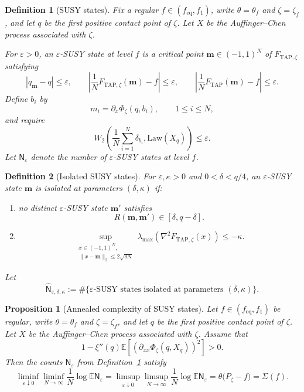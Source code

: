\documentclass[10pt,a4paper]{amsart}
\newtheorem{proposition}{Proposition}
\newtheorem{definition}{Definition}
\newcommand{\Law}{\mathrm{Law}}
\newcommand{\TAP}{\mathrm{TAP}}
\newcommand{\bfm}{\mathbf{m}}
\newcommand{\dE}{\mathbb{E}}%
\newcommand{\eq}{\mathrm{eq}}
\newcommand{\ve}{\varepsilon}
\begin{document}
	\begin{definition}[SUSY states]\label{def:susy-state}
		Fix a regular \(f\in(f_{\eq},f_1)\), write \(\theta=\theta_f\) and
		\(\zeta=\zeta_f\), and let \(q\) be the first positive contact point of
		\(\zeta\). Let \(X\) be the Auffinger--Chen process associated with
		\(\zeta\).
		
		For \(\ve>0\), an \(\ve\)-SUSY state at level \(f\) is a
		critical point \(\bfm\in(-1,1)^N\) of \(F_{\TAP,\zeta}\) satisfying
		\[
		|q_\bfm-q|\le\ve,
		\qquad
		\left|\frac1N F_{\TAP,\zeta}(\bfm)-f\right|\le\ve,
		\qquad
		\left|\frac1N F_{\TAP}(\bfm)-f\right|\le\ve.
		\]
		Define \(b_i\) by
		\[
		m_i=\partial_x\Phi_\zeta(q,b_i),
		\qquad 1\le i\le N,
		\]
		and require
		\[
		W_2\left(
		\frac1N\sum_{i=1}^N\delta_{b_i},
		\Law(X_q)
		\right)\le\ve.
		\]
		Let \(\mathsf N_\ve\) denote the number of
		\(\ve\)-SUSY states at level \(f\).
	\end{definition}

	\begin{definition}[Isolated SUSY states]\label{def:isolated-susy-state}
		For \(\ve,\kappa>0\) and \(0<\delta<q/4\), an
		\(\ve\)-SUSY state \(\bfm\) is isolated at parameters
		\((\delta,\kappa)\) if:
		\begin{enumerate}[label=\textup{(\roman*)}]
			\item no distinct \(\ve\)-SUSY state \(\bfm'\)
			satisfies
			\[
			R(\bfm,\bfm')\in[\delta,q-\delta].
			\]
			\item
			\[
			\sup_{\substack{
					x\in(-1,1)^N,\\
					\|x-\bfm\|_2\le2\sqrt{\delta N}
			}}
			\lambda_{\max}\!\left(
			\nabla^2F_{\TAP,\zeta}(x)
			\right)
			\le-\kappa.
			\]
		\end{enumerate}
		Let
		\[
		\widehat{\mathsf N}_{\ve,\delta,\kappa}
		:=
		\#\{\text{\(\ve\)-SUSY states isolated at parameters
			\((\delta,\kappa)\)}\}.
		\]
	\end{definition}

	\begin{proposition}[Annealed complexity of SUSY states]\label{prop:susy-annealed}
		Let \(f\in(f_{\eq},f_1)\) be regular, write
		\(\theta=\theta_f\) and \(\zeta=\zeta_f\), and let \(q\) be the first
		positive contact point of \(\zeta\). Let \(X\) be the
		Auffinger--Chen process associated with \(\zeta\). Assume that
		\[
		1-\xi''(q)\dE\left[
		\left(
		\partial_{xx}\Phi_\zeta(q,X_q)
		\right)^2
		\right]>0.
		\]
		Then the counts \(\mathsf N_\ve\) from
		Definition~\ref{def:susy-state} satisfy
		\[
		\liminf_{\ve\downarrow0}
		\liminf_{N\to\infty}
		\frac1N\log\dE\mathsf N_\ve
		=
		\limsup_{\ve\downarrow0}
		\limsup_{N\to\infty}
		\frac1N\log\dE\mathsf N_\ve
		=
		\theta\bigl(P_\zeta-f\bigr)
		=
		\Sigma(f).
		\]
	\end{proposition}
\end{document}
